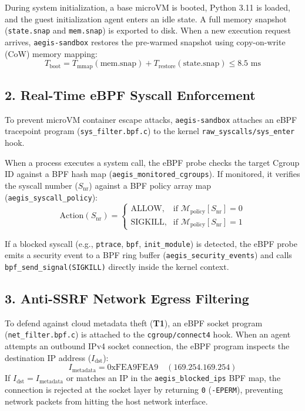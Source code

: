 \documentclass[10pt,twocolumn,a4paper]{article}
\begin{document}
During system initialization, a base microVM is booted, Python 3.11 is loaded, and the guest initialization agent enters an idle state. A full memory snapshot (\texttt{state.snap} and \texttt{mem.snap}) is exported to disk. When a new execution request arrives, \texttt{aegis-sandbox} restores the pre-warmed snapshot using copy-on-write (CoW) memory mapping:
\begin{equation}
T_{\text{boot}} = T_{\text{mmap}}(\text{mem.snap}) + T_{\text{restore}}(\text{state.snap}) \le 8.5\text{ ms}
\end{equation}

\subsection{2. Real-Time eBPF Syscall Enforcement}
To prevent microVM container escape attacks, \texttt{aegis-sandbox} attaches an eBPF tracepoint program (\texttt{sys\_filter.bpf.c}) to the kernel \texttt{raw\_syscalls/sys\_enter} hook. 

When a process executes a system call, the eBPF probe checks the target Cgroup ID against a BPF hash map (\texttt{aegis\_monitored\_cgroups}). If monitored, it verifies the syscall number ($S_{\text{nr}}$) against a BPF policy array map (\texttt{aegis\_syscall\_policy}):
\begin{equation}
\text{Action}(S_{\text{nr}}) = 
\begin{cases} 
\text{ALLOW}, & \text{if } \mathcal{M}_{\text{policy}}[S_{\text{nr}}] = 0 \\
\text{SIGKILL}, & \text{if } \mathcal{M}_{\text{policy}}[S_{\text{nr}}] = 1
\end{cases}
\end{equation}

If a blocked syscall (e.g., \texttt{ptrace}, \texttt{bpf}, \texttt{init\_module}) is detected, the eBPF probe emits a security event to a BPF ring buffer (\texttt{aegis\_security\_events}) and calls \texttt{bpf\_send\_signal(SIGKILL)} directly inside the kernel context.

\subsection{3. Anti-SSRF Network Egress Filtering}
To defend against cloud metadata theft (\textbf{T1}), an eBPF socket program (\texttt{net\_filter.bpf.c}) is attached to the \texttt{cgroup/connect4} hook. When an agent attempts an outbound IPv4 socket connection, the eBPF program inspects the destination IP address ($I_{\text{dst}}$):
\begin{equation}
I_{\text{metadata}} = \text{0xFEA9FEA9} \quad (169.254.169.254)
\end{equation}
If $I_{\text{dst}} = I_{\text{metadata}}$ or matches an IP in the \texttt{aegis\_blocked\_ips} BPF map, the connection is rejected at the socket layer by returning \texttt{0} (\texttt{-EPERM}), preventing network packets from hitting the host network interface.
\end{document}
